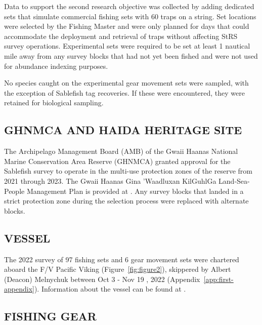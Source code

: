 \documentclass[12pt]{article}\usepackage[]{graphicx}\usepackage[]{color}
\begin{document}
Data to support the second research objective was collected by adding dedicated sets that simulate commercial fishing sets with 60 traps on a string. Set locations were selected by the Fishing Master and were only planned for days that could accommodate the deployment and retrieval of traps without affecting StRS survey operations. Experimental sets were required to be set at least 1 nautical mile away from any survey blocks that had not yet been fished and were not used for abundance indexing purposes.

No species caught on the experimental gear movement sets were sampled, with the exception of Sablefish tag recoveries. If these were encountered, they were retained for biological sampling.

\hypertarget{ghnmca-and-haida-heritage-site}{%
\subsection{GHNMCA AND HAIDA HERITAGE SITE}\label{ghnmca-and-haida-heritage-site}}

The Archipelago Management Board (AMB) of the Gwaii Haanas National Marine Conservation Area Reserve (GHNMCA) granted approval for the Sablefish survey to operate in the multi-use protection zones of the reserve from 2021 through 2023. The Gwaii Haanas Gina 'Waadluxan KilGuhlGa Land-Sea-People Management Plan is provided at . Any survey blocks that landed in a strict protection zone during the selection process were replaced with alternate blocks.

\hypertarget{vessel}{%
\subsection{VESSEL}\label{vessel}}

The 2022 survey of 97 fishing sets and 6 gear movement sets were chartered aboard the F/V Pacific Viking (Figure~\ref{fig:figure2}), skippered by Albert (Deacon) Melnychuk between Oct 3 - Nov 19 , 2022 (Appendix~\ref{app:first-appendix}). Information about the vessel can be found at .

\hypertarget{fishing-gear}{%
\subsection{FISHING GEAR}\label{fishing-gear}}
\end{document}
